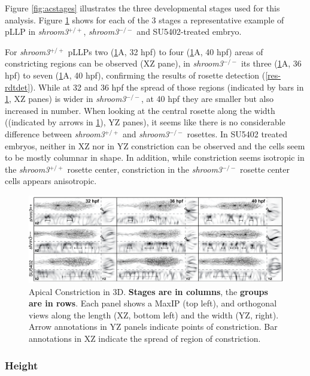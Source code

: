 \documentclass[10pt, b5paper, singlespacinge, twoside]{reedthesis} %
\theoremstyle{definition}
\theoremstyle{definition}
\theoremstyle{definition}
\theoremstyle{remark}
\begin{document}
Figure \ref{fig:acstages} illustrates the three developmental stages used for this analysis. Figure \ref{fig:acshape} shows for each of the 3 stages a representative example of pLLP in \emph{shroom3}\(^{+/+}\), \emph{shroom3}\(^{-/-}\) and SU5402-treated embryo.

For \emph{shroom3}\(^{+/+}\) pLLPs two (\ref{fig:acshape}A, 32 hpf) to four (\ref{fig:acshape}A, 40 hpf) areas of constricting regions can be observed (XZ pane), in \emph{shroom3}\(^{-/-}\) its three (\ref{fig:acshape}A, 36 hpf) to seven (\ref{fig:acshape}A, 40 hpf), confirming the results of rosette detection (\ref{res-rdtdet}). While at 32 and 36 hpf the spread of those regions (indicated by bars in \ref{fig:acshape}, XZ panes) is wider in \emph{shroom3}\(^{-/-}\), at 40 hpf they are smaller but also increased in number. When looking at the central rosette along the width ((indicated by arrows in \ref{fig:acshape}), YZ panes), it seems like there is no considerable difference between \emph{shroom3}\(^{+/+}\) and \emph{shroom3}\(^{-/-}\) rosettes. In SU5402 treated embryos, neither in XZ nor in YZ constriction can be observed and the cells seem to be mostly columnar in shape. In addition, while constriction seems isotropic in the \emph{shroom3}\(^{+/+}\) rosette center, constriction in the \emph{shroom3}\(^{-/-}\) rosette center cells appears anisotropic.


\begin{figure}[H]

{\centering \includegraphics[width=0.95\linewidth]{figures/results/04_constriction/Figure_5-1} 

}

\caption[Apical Constriction in 3D]{Apical Constriction in 3D. \textbf{Stages are in columns}, the \textbf{groups are in rows}. Each panel shows a MaxIP (top left), and orthogonal views along the length (XZ, bottom left) and the width (YZ, right). Arrow annotations in YZ panels indicate points of constriction. Bar annotations in XZ indicate the spread of region of constriction.}\label{fig:acshape}
\end{figure}
\hypertarget{height}{%
\subsubsection{Height}\label{height}}
\end{document}
